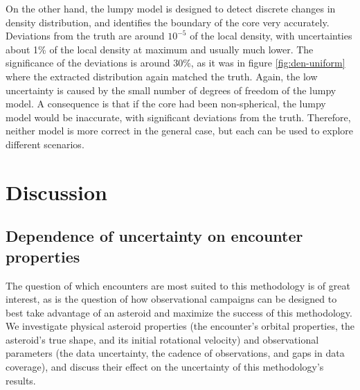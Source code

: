 \documentclass[fleqn,usenatbib]{mnras}
\begin{document}
On the other hand, the lumpy model is designed to detect discrete changes in density distribution, and identifies the boundary of the core very accurately. Deviations from the truth are around $10^{-5}$ of the local density, with uncertainties about 1\% of the local density at maximum and usually much lower. The significance of the deviations is around 30\%, as it was in figure \ref{fig:den-uniform} where the extracted distribution again matched the truth. Again, the low uncertainty is caused by the small number of degrees of freedom of the lumpy model. A consequence is that if the core had been non-spherical, the lumpy model would be inaccurate, with significant deviations from the truth. Therefore, neither model is more correct in the general case, but each can be used to explore different scenarios.




\section{Discussion}
\label{sec:discussion}


\subsection{Dependence of uncertainty on encounter properties}
\label{sec:fit-uncertainty}


The question of which encounters are most suited to this methodology is of great interest, as is the question of how observational campaigns can be designed to best take advantage of an asteroid and maximize the success of this methodology. We investigate physical asteroid properties (the encounter's orbital properties, the asteroid's true shape, and its initial rotational velocity) and observational parameters (the data uncertainty, the cadence of observations, and gaps in data coverage), and discuss their effect on the uncertainty of this methodology's results.
\end{document}
